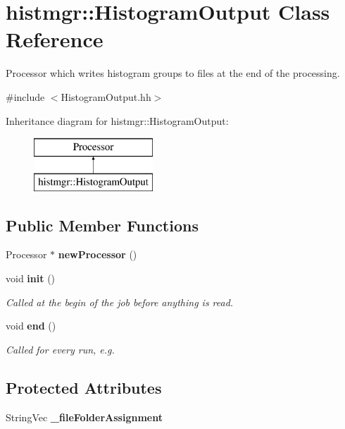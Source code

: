 \section{histmgr\-:\-:Histogram\-Output Class Reference}
\label{classhistmgr_1_1HistogramOutput}


Processor which writes histogram groups to files at the end of the processing.  




{\ttfamily \#include $<$Histogram\-Output.\-hh$>$}

Inheritance diagram for histmgr\-:\-:Histogram\-Output\-:\begin{figure}[H]
\begin{center}
\leavevmode
\includegraphics[height=2.000000cm]{classhistmgr_1_1HistogramOutput}
\end{center}
\end{figure}
\subsection*{Public Member Functions}
\begin{DoxyCompactItemize}
\item 
Processor $\ast$ {\bfseries new\-Processor} ()\label{classhistmgr_1_1HistogramOutput_aec1ae9dabcace0c5d9c425d4305153aa}

\item 
void {\bf init} ()
\begin{DoxyCompactList}\small\item\em Called at the begin of the job before anything is read. \end{DoxyCompactList}\item 
void {\bf end} ()
\begin{DoxyCompactList}\small\item\em Called for every run, e.\-g. \end{DoxyCompactList}\end{DoxyCompactItemize}
\subsection*{Protected Attributes}
\begin{DoxyCompactItemize}
\item 
String\-Vec {\bfseries \-\_\-file\-Folder\-Assignment}\label{classhistmgr_1_1HistogramOutput_acf932812a8468eb3106dca6a5b9040ea}

\end{DoxyCompactItemize}


